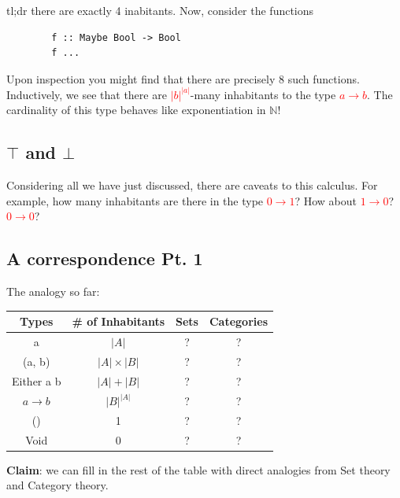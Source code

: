 \documentclass[tikz]{beamer}
\newcommand{\mred}[1]{\textcolor{red}{$#1$}}
\theoremstyle{definition}
\begin{document}
\begin{frame}[fragile]

	tl;dr there are exactly 4 inabitants. Now, consider the functions
	
	\begin{verbatim}
		f :: Maybe Bool -> Bool
		f ...
	\end{verbatim}
\end{frame}

\frame
{
	Upon inspection you might find that there are precisely 8 such functions. Inductively, we see that there are \mred{|b|^{|a|}}-many inhabitants to the type \mred{a \to b}. The cardinality of this type behaves like exponentiation in $\mathbb{N}$!
}

\subsection{$\top$ and $\bot$}

\frame
{
	Considering all we have just discussed, there are caveats to this calculus. For example, how many inhabitants are there in the type \mred{0 \to 1}? How about \mred{1 \to 0}? \mred{0 \to 0}?
}

\subsection{A correspondence Pt. 1}
\frame
{
	The analogy so far: 
	
	\begin{center}
		\begin{tabular}{|c|c|c|c|}
			\hline
			Types & \# of Inhabitants  & Sets & Categories \\
			\hline a       & $|A|$ & ?  & ? \\
			(a, b) &  $|A| \times |B| $ & ? & ? \\
			Either a b & $|A| + |B|$ & ? & ? \\
			$a \to b$ & $|B|^{|A|}$ & ? & ? \\
			() & 1 & ? & ? \\
			Void & 0 & ? & ? \\ \hline
		\end{tabular}
	\end{center}

}

\frame
{ 
	\textbf{Claim}: we can fill in the rest of the table with direct analogies from Set theory and Category theory. 
}
\end{document}
